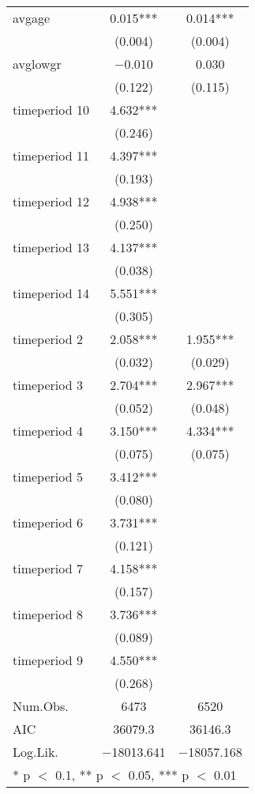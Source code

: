 \documentclass[
]{article}
\begin{document}
\begin{table}[!h]
\begin{tabular}[t]{lcc}
avgage & \num{0.015}*** & \num{0.014}***\\
 & (\num{0.004}) & (\num{0.004})\\
avglowgr & \num{-0.010} & \num{0.030}\\
 & (\num{0.122}) & (\num{0.115})\\
timeperiod 10 & \num{4.632}*** & \\
 & (\num{0.246}) & \\
timeperiod 11 & \num{4.397}*** & \\
 & (\num{0.193}) & \\
timeperiod 12 & \num{4.938}*** & \\
 & (\num{0.250}) & \\
timeperiod 13 & \num{4.137}*** & \\
 & (\num{0.038}) & \\
timeperiod 14 & \num{5.551}*** & \\
 & (\num{0.305}) & \\
timeperiod 2 & \num{2.058}*** & \num{1.955}***\\
 & (\num{0.032}) & (\num{0.029})\\
timeperiod 3 & \num{2.704}*** & \num{2.967}***\\
 & (\num{0.052}) & (\num{0.048})\\
timeperiod 4 & \num{3.150}*** & \num{4.334}***\\
 & (\num{0.075}) & (\num{0.075})\\
timeperiod 5 & \num{3.412}*** & \\
 & (\num{0.080}) & \\
timeperiod 6 & \num{3.731}*** & \\
 & (\num{0.121}) & \\
timeperiod 7 & \num{4.158}*** & \\
 & (\num{0.157}) & \\
timeperiod 8 & \num{3.736}*** & \\
 & (\num{0.089}) & \\
timeperiod 9 & \num{4.550}*** & \\
 & (\num{0.268}) & \\
\midrule
Num.Obs. & \num{6473} & \num{6520}\\
AIC & \num{36079.3} & \num{36146.3}\\
Log.Lik. & \num{-18013.641} & \num{-18057.168}\\
\bottomrule
\multicolumn{3}{l}{\rule{0pt}{1em}* p $<$ 0.1, ** p $<$ 0.05, *** p $<$ 0.01}\\
\end{tabular}
\end{table}
\end{document}
